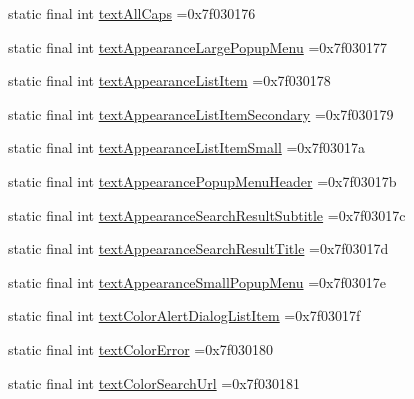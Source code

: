 \begin{DoxyCompactItemize}
\item 
static final int \mbox{\hyperlink{classcom_1_1example_1_1trainawearapplication_1_1_r_1_1attr_a2796ae383c1b37f83e5aded2b42d9b06}{text\+All\+Caps}} =0x7f030176
\item 
static final int \mbox{\hyperlink{classcom_1_1example_1_1trainawearapplication_1_1_r_1_1attr_aa937402e4ec73262dffec8b74443322a}{text\+Appearance\+Large\+Popup\+Menu}} =0x7f030177
\item 
static final int \mbox{\hyperlink{classcom_1_1example_1_1trainawearapplication_1_1_r_1_1attr_aca32edb54bde3b5d70be4efa1efc9392}{text\+Appearance\+List\+Item}} =0x7f030178
\item 
static final int \mbox{\hyperlink{classcom_1_1example_1_1trainawearapplication_1_1_r_1_1attr_a5f56fa296b9667a53d673a89bce08c86}{text\+Appearance\+List\+Item\+Secondary}} =0x7f030179
\item 
static final int \mbox{\hyperlink{classcom_1_1example_1_1trainawearapplication_1_1_r_1_1attr_af6cd8bc5bbab68ceb847067da5b4be02}{text\+Appearance\+List\+Item\+Small}} =0x7f03017a
\item 
static final int \mbox{\hyperlink{classcom_1_1example_1_1trainawearapplication_1_1_r_1_1attr_ab34a959b991c47f631240841e55d64af}{text\+Appearance\+Popup\+Menu\+Header}} =0x7f03017b
\item 
static final int \mbox{\hyperlink{classcom_1_1example_1_1trainawearapplication_1_1_r_1_1attr_a7c5f9c532f87a44728789777e362cddf}{text\+Appearance\+Search\+Result\+Subtitle}} =0x7f03017c
\item 
static final int \mbox{\hyperlink{classcom_1_1example_1_1trainawearapplication_1_1_r_1_1attr_a2c41f110250a5629332dde0437b0fb92}{text\+Appearance\+Search\+Result\+Title}} =0x7f03017d
\item 
static final int \mbox{\hyperlink{classcom_1_1example_1_1trainawearapplication_1_1_r_1_1attr_aca400d7ce7275da2f7cb6cd18040d351}{text\+Appearance\+Small\+Popup\+Menu}} =0x7f03017e
\item 
static final int \mbox{\hyperlink{classcom_1_1example_1_1trainawearapplication_1_1_r_1_1attr_a5be0e14e8d88290050c3a42d716580b8}{text\+Color\+Alert\+Dialog\+List\+Item}} =0x7f03017f
\item 
static final int \mbox{\hyperlink{classcom_1_1example_1_1trainawearapplication_1_1_r_1_1attr_a24b1ff1d1704c18bb112244e16d1278a}{text\+Color\+Error}} =0x7f030180
\item 
static final int \mbox{\hyperlink{classcom_1_1example_1_1trainawearapplication_1_1_r_1_1attr_a8902d087f22c961e9f6ce685b79fd546}{text\+Color\+Search\+Url}} =0x7f030181

\end{DoxyCompactItemize}

